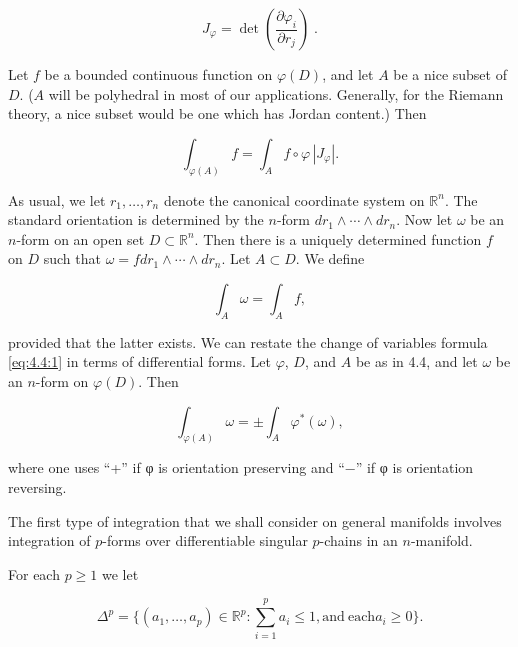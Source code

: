 \[
J_{\varphi}=\det\left(\frac{\partial\varphi_{i}}{\partial r_{j}}\right)\;.
\]

Let $f$ be a bounded continuous function on $\varphi(D)$, and let $A$ be a nice subset of $D$. ($A$ will be polyhedral in most of our applications. Generally, for the Riemann theory, a nice subset would be one which has Jordan content.) Then

\begin{equation}
\tag{1}\label{eq:4.4:1}
\int_{\varphi(A)}f=\int_{A}f\circ\varphi\,|J_{\varphi}|.
\end{equation}

\label{thm:4.5}
As usual, we let $r_1, \ldots, r_n$ denote the canonical coordinate system on $\mathbb{R}^n$. The standard orientation is determined by the $n$-form $dr_1 \wedge \cdots \wedge dr_n$. Now let $\omega$ be an $n$-form on an open set $D \subset \mathbb{R}^n$. Then there is a uniquely determined function $f$ on $D$ such that $\omega = f dr_1 \wedge \cdots \wedge dr_n$. Let $A \subset D$. We define

\begin{equation}
\tag{1}\label{eq:4.5:1}
\int_{A}\omega=\int_{A}f,
\end{equation}

provided that the latter exists. We can restate the change of variables formula \eqref{eq:4.4:1} in terms of differential forms. Let $\varphi$, $D$, and $A$ be as in 4.4, and let $\omega$ be an $n$-form on $\varphi(D)$. Then

\begin{equation}
\tag{2}\label{eq:4.5:2}
\int_{\varphi(A)}\omega=\pm\int_{A}\varphi^{*}(\omega),
\end{equation}

where one uses “+” if φ is orientation preserving and “−” if φ is orientation reversing.

\label{thm:4.6}
The first type of integration that we shall consider on general manifolds involves integration of $p$-forms over differentiable singular $p$-chains in an $n$-manifold.

For each  $ p \geq 1 $ we let

\begin{equation}
\tag{1}\label{eq:4.6:1}
\Delta^{p}=\Big\{(a_{1},\ldots,a_{p})\in\mathbb{R}^{p}\colon\sum_{i=1}^{p}a_{i}\leq1,\mathrm{and~each}a_{i}\geq0\Big\}.
\end{equation}

